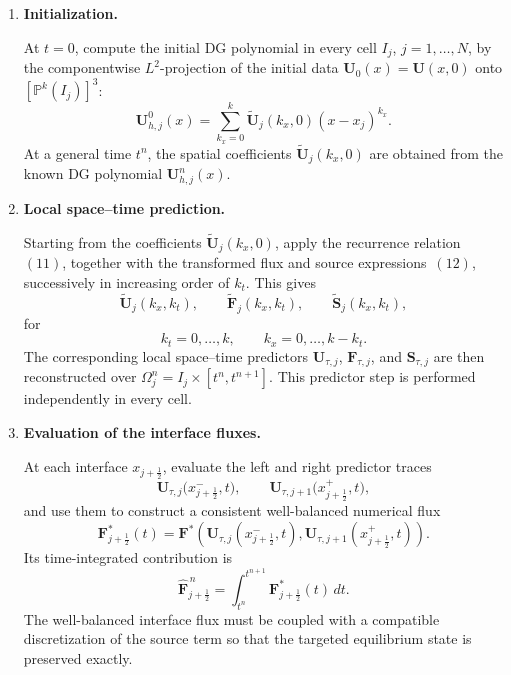 \documentclass[11pt]{article}
\begin{document}
\begin{enumerate}

    \item \textbf{Initialization.}
    
    At \(t=0\), compute the initial DG polynomial in every cell
    \(I_j\), \(j=1,\ldots,N\), by the componentwise \(L^2\)-projection
    of the initial data \(\mathbf{U}_0(x)=\mathbf{U}(x,0)\) onto
    \([\mathbb{P}^k(I_j)]^3\):
    \[
        \mathbf{U}_{h,j}^{0}(x)
        =
        \sum_{k_x=0}^{k}
        \widetilde{\mathbf{U}}_j(k_x,0)
        (x-x_j)^{k_x}.
    \]
    At a general time \(t^n\), the spatial coefficients
    \(\widetilde{\mathbf{U}}_j(k_x,0)\) are obtained from the known DG
    polynomial \(\mathbf{U}_{h,j}^{n}(x)\).

    \item \textbf{Local space--time prediction.}
    
    Starting from the coefficients
    \(\widetilde{\mathbf{U}}_j(k_x,0)\), apply the recurrence
    relation~\((11)\), together with the transformed flux and source
    expressions~\((12)\), successively in increasing order of \(k_t\).
    This gives
    \[
        \widetilde{\mathbf{U}}_j(k_x,k_t),\qquad
        \widetilde{\mathbf{F}}_j(k_x,k_t),\qquad
        \widetilde{\mathbf{S}}_j(k_x,k_t),
    \]
    for
    \[
        k_t=0,\ldots,k,
        \qquad
        k_x=0,\ldots,k-k_t.
    \]
    The corresponding local space--time predictors
    \(\mathbf{U}_{\tau,j}\), \(\mathbf{F}_{\tau,j}\), and
    \(\mathbf{S}_{\tau,j}\) are then reconstructed over
    \(\Omega_j^n=I_j\times[t^n,t^{n+1}]\). This predictor step is
    performed independently in every cell.

    \item \textbf{Evaluation of the interface fluxes.}
    
    At each interface \(x_{j+\frac12}\), evaluate the left and right
    predictor traces
    \[
        \mathbf{U}_{\tau,j}
        \bigl(x_{j+\frac12}^{-},t\bigr),
        \qquad
        \mathbf{U}_{\tau,j+1}
        \bigl(x_{j+\frac12}^{+},t\bigr),
    \]
    and use them to construct a consistent well-balanced numerical
    flux
    \[
        \mathbf{F}^{*}_{j+\frac12}(t)
        =
        \mathbf{F}^{*}\!\left(
            \mathbf{U}_{\tau,j}(x_{j+\frac12}^{-},t),
            \mathbf{U}_{\tau,j+1}(x_{j+\frac12}^{+},t)
        \right).
    \]
    Its time-integrated contribution is
    \[
        \widehat{\mathbf{F}}_{j+\frac12}^{\,n}
        =
        \int_{t^n}^{t^{n+1}}
        \mathbf{F}^{*}_{j+\frac12}(t)\,dt.
    \]
    The well-balanced interface flux must be coupled with a compatible
    discretization of the source term so that the targeted equilibrium
    state is preserved exactly.


\end{enumerate}
\end{document}

